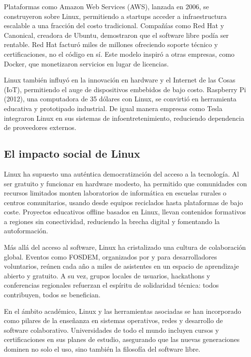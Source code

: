 \documentclass[a4paper,12pt]{article}
\begin{document}
Plataformas como Amazon Web Services (AWS), lanzada en 2006, se construyeron
sobre Linux, permitiendo a startups acceder a infraestructura escalable a una
fracción del costo tradicional. Compañías como Red Hat y Canonical, creadora de
Ubuntu, demostraron que el software libre podía ser rentable. Red Hat facturó
miles de millones ofreciendo soporte técnico y certificaciones, no el código en
sí. Este modelo inspiró a otras empresas, como Docker, que monetizaron servicios
en lugar de licencias.

Linux también influyó en la innovación en hardware y el Internet de las Cosas
(IoT), permitiendo el auge de dispositivos embebidos de bajo costo. Raspberry Pi
(2012), una computadora de 35 dólares con Linux, se convirtió en herramienta
educativa y prototipado industrial. De igual manera empresas como Tesla
integraron Linux en sus sistemas de infoentretenimiento, reduciendo dependencia
de proveedores externos. 

\subsection{El impacto social de Linux}

Linux ha supuesto una auténtica democratización del acceso a la tecnología. Al
ser gratuito y funcionar en hardware modesto, ha permitido que comunidades con
recursos limitados monten laboratorios de informática en escuelas rurales o
centros comunitarios, usando desde equipos reciclados hasta plataformas de bajo
coste. Proyectos educativos offline basados en Linux, llevan contenidos
formativos a regiones sin conectividad, reduciendo la brecha digital y 
fomentando la autoformación.

Más allá del acceso al software, Linux ha cristalizado una cultura de
colaboración global.  Eventos como FOSDEM, organizados por y para
desarrolladores voluntarios, reúnen cada año a miles de asistentes en un espacio
de aprendizaje abierto y gratuito. A su vez, grupos locales de usuarios,
hackathons y conferencias regionales refuerzan el espíritu de solidaridad
técnica: todos contribuyen, todos se benefician.

En el ámbito académico, Linux y las herramientas asociadas se han incorporado
como pilares de la enseñanza en sistemas operativos, redes y desarrollo de
software colaborativo. Universidades de todo el mundo incluyen cursos y
certificaciones en sus planes de estudio, asegurando que las nuevas generaciones
dominen no solo el uso, sino también la filosofía del software libre.
\end{document}
